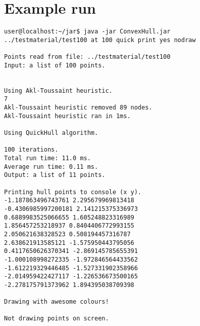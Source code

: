 \documentclass[a4paper,12pt,leqno,titlepage]{article}
\begin{document}
\section{Example run}
\begin{verbatim}
user@localhost:~/jar$ java -jar ConvexHull.jar
../testmaterial/test100 at 100 quick print yes nodraw

Points read from file: ../testmaterial/test100
Input: a list of 100 points.


Using Akl-Toussaint heuristic.
7
Akl-Toussaint heuristic removed 89 nodes.
Akl-Toussaint heuristic ran in 1ms.

Using QuickHull algorithm.

100 iterations.
Total run time: 11.0 ms.
Average run time: 0.11 ms.
Output: a list of 11 points.

Printing hull points to console (x y).
-1.187863496743761 2.295679969813418
-0.4306985997200181 2.141215375336973
0.6889983525066655 1.605248823316989
1.856457253218937 0.8404406772993155
2.050621638328523 0.508194457316787
2.638621913585121 -1.575950443795056
0.4117650626370341 -2.869145785655391
-1.000108998272335 -1.972846564433562
-1.612219329446485 -1.527331902358966
-2.014959422427117 -1.226536673500165
-2.278175791373962 1.894395038709398

Drawing with awesome colours!

Not drawing points on screen.
\end{verbatim}
\end{document}
